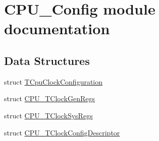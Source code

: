 \hypertarget{group___c_p_u___config__module}{}\section{C\+P\+U\+\_\+\+Config module documentation}
\label{group___c_p_u___config__module}
\subsection*{Data Structures}
\begin{DoxyCompactItemize}
\item 
struct \hyperlink{struct_t_cpu_clock_configuration}{T\+Cpu\+Clock\+Configuration}
\item 
struct \hyperlink{struct_c_p_u___t_clock_gen_regs}{C\+P\+U\+\_\+\+T\+Clock\+Gen\+Regs}
\item 
struct \hyperlink{struct_c_p_u___t_clock_sys_regs}{C\+P\+U\+\_\+\+T\+Clock\+Sys\+Regs}
\item 
struct \hyperlink{struct_c_p_u___t_clock_config_descriptor}{C\+P\+U\+\_\+\+T\+Clock\+Config\+Descriptor}
\end{DoxyCompactItemize}
